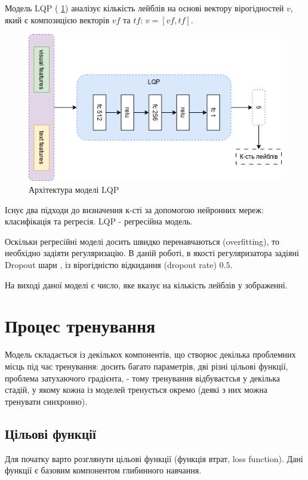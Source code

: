 \documentclass{udstu}
\begin{document}
Модель LQP (\figurename{ \ref{figure:lqp}}) аналізує кількість лейблів на основі вектору вірогідностей $v$,
який є композицією векторів $vf$ та $tf$: $v = [vf, tf]$.

\begin{figure}[!ht]
	\centering
	\includegraphics[width=1.0\textwidth]{PNG/lqp}
	\caption{Архітектура моделі LQP}
	\label{figure:lqp}
\end{figure}

Існує два підходи до визначення к-сті за допомогою нейронних мереж: класифікація та регресія.
LQP - регресійна модель.

Оскільки регресійні моделі досить швидко перенавчаються (overfitting), то необхідно задіяти регуляризацію.
В даній роботі, в якості регуляризатора задіяні Dropout шари \cite{dropout}, із вірогідністю відкидання (dropout rate) $0.5$.

На виході даної моделі є число, яке вказує на кількість лейблів у зображенні.


\section{Процес тренування}

Модель складається із декількох компонентів, що створює декілька проблемних місць під час тренування:
досить багато параметрів, дві різні цільові функції, проблема затухаючого градієнта, -
тому тренування відбуваєтсья у декілька стадій, у якому кожна із моделей тренується окремо
(деякі з них можна тренувати синхронно).


\subsection{Цільові функції}

Для початку варто розглянути цільові функції (функція втрат, loss function).
Дані функції є базовим компонентом глибинного навчання.
\end{document}
